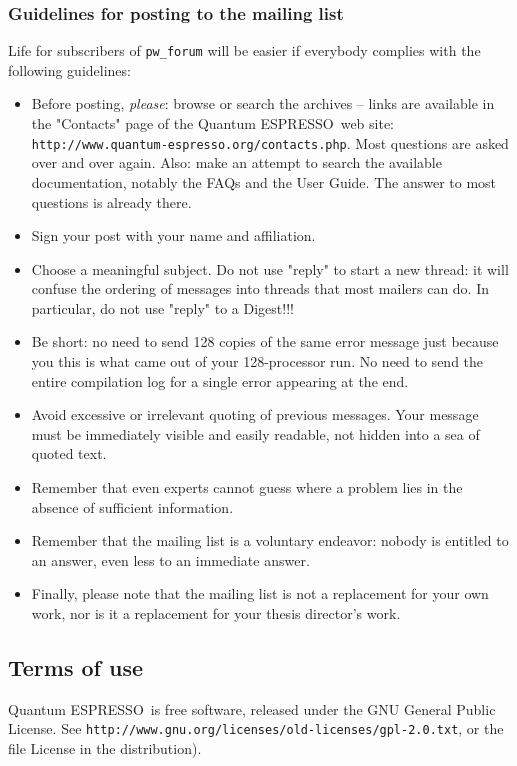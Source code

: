 \documentclass[12pt,a4paper]{article}
\def\qe{{\sc Quantum ESPRESSO}}
\begin{document}
\subsubsection{Guidelines for posting to the mailing list}
\label{SubSec:Guidelines}
Life for subscribers of \texttt{pw\_forum} will be easier if everybody 
complies with the following guidelines:
\begin{itemize}
\item Before posting, {\em please}: browse or search the archives -- 
  links are available in the "Contacts" page  of the \qe\ web site:\\
  \texttt{http://www.quantum-espresso.org/contacts.php}. Most questions 
  are asked over and over again. Also: make an attempt to search the
  available documentation, notably the FAQs and the User Guide.
  The answer to most questions is already there.
\item Sign your post with your name and affiliation.
\item Choose a meaningful subject. Do not use "reply" to start a new
  thread:
  it will confuse the ordering of messages into threads that most mailers
  can do. In particular, do not use "reply" to a Digest!!!
\item Be short: no need to send 128 copies of the same error message just
  because you this is what came out of your 128-processor run. No need to
  send the entire compilation log for a single error appearing at the end.
\item Avoid excessive or irrelevant quoting of previous messages. Your
  message must be immediately visible and easily readable, not hidden
  into a sea of quoted text.
\item Remember that even experts cannot guess where a problem lies in
  the absence of sufficient information.
\item Remember that the mailing list is a voluntary endeavor: nobody is 
  entitled to an answer, even less to an immediate answer.
\item Finally, please note that the mailing list is not a replacement
  for your own work, nor is it a replacement for your thesis director's work.
\end{itemize}
 
\subsection{Terms of use}

\qe\ is free software, released under the 
GNU General Public License. See
\texttt{http://www.gnu.org/licenses/old-licenses/gpl-2.0.txt}, 
or the file License in the distribution).
    
\end{document}

